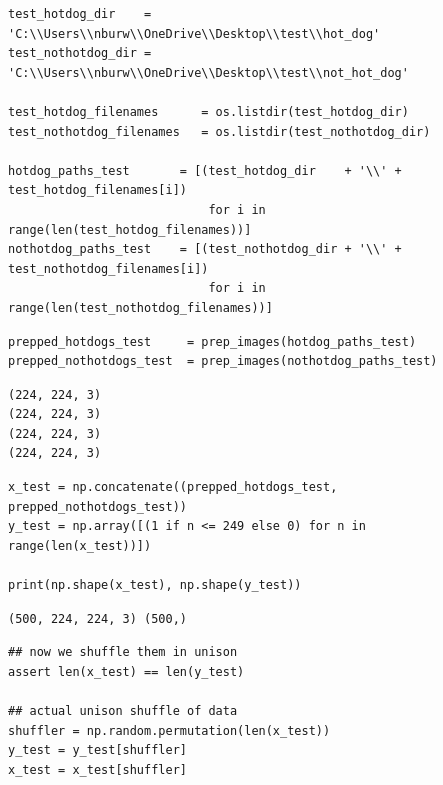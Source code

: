 \documentclass[
]{article}
\begin{document}
\begin{Verbatim}[frame=single]
test_hotdog_dir    = 'C:\\Users\\nburw\\OneDrive\\Desktop\\test\\hot_dog'
test_nothotdog_dir = 'C:\\Users\\nburw\\OneDrive\\Desktop\\test\\not_hot_dog'

test_hotdog_filenames      = os.listdir(test_hotdog_dir)
test_nothotdog_filenames   = os.listdir(test_nothotdog_dir)

hotdog_paths_test       = [(test_hotdog_dir    + '\\' + test_hotdog_filenames[i])    
                            for i in range(len(test_hotdog_filenames))]
nothotdog_paths_test    = [(test_nothotdog_dir + '\\' + test_nothotdog_filenames[i]) 
                            for i in range(len(test_nothotdog_filenames))]
\end{Verbatim}

\begin{Verbatim}[frame=single]
prepped_hotdogs_test     = prep_images(hotdog_paths_test)
prepped_nothotdogs_test  = prep_images(nothotdog_paths_test)
\end{Verbatim}

\begin{verbatim}
(224, 224, 3)
(224, 224, 3)
(224, 224, 3)
(224, 224, 3)
\end{verbatim}

\begin{Verbatim}[frame=single]
x_test = np.concatenate((prepped_hotdogs_test, prepped_nothotdogs_test))
y_test = np.array([(1 if n <= 249 else 0) for n in range(len(x_test))])

print(np.shape(x_test), np.shape(y_test))
\end{Verbatim}

\begin{verbatim}
(500, 224, 224, 3) (500,)
\end{verbatim}

\begin{Verbatim}[frame=single]
## now we shuffle them in unison
assert len(x_test) == len(y_test)

## actual unison shuffle of data
shuffler = np.random.permutation(len(x_test))
y_test = y_test[shuffler]
x_test = x_test[shuffler]
\end{Verbatim}
\end{document}
